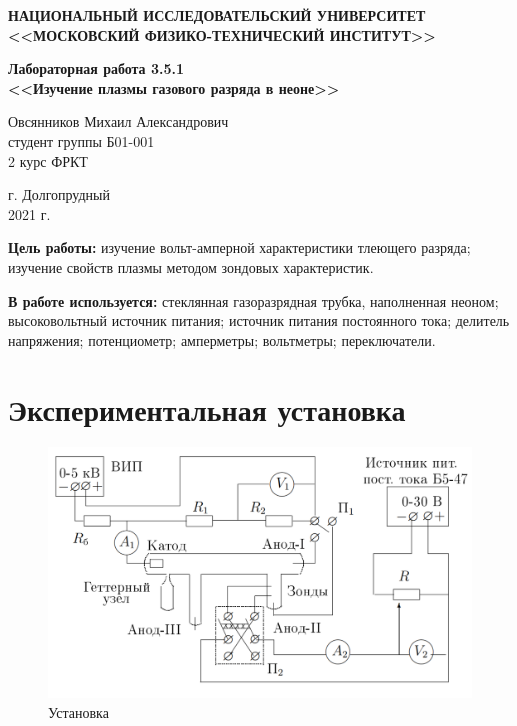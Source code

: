 \documentclass[a4paper,12pt]{article} %
\begin{document}
	
	
	\begin{center}
		
		
		\textbf{НАЦИОНАЛЬНЫЙ ИССЛЕДОВАТЕЛЬСКИЙ УНИВЕРСИТЕТ \\ <<МОСКОВСКИЙ ФИЗИКО-ТЕХНИЧЕСКИЙ ИНСТИТУТ>>}
		\vspace{13ex}
		
		\textbf{Лабораторная работа 3.5.1\\ <<Изучение плазмы газового разряда в неоне>>}
		\vspace{40ex}
		
		\normalsize{Овсянников Михаил Александрович \\ студент группы Б01-001\\ 2 курс ФРКТ\\}
	\end{center}
	
	\vfill 
	
	\begin{center}
		г. Долгопрудный\\ 
		2021 г.
	\end{center}
	
	
	\thispagestyle{empty} %
	\newpage
	
	\textbf{Цель работы:} изучение вольт-амперной характеристики тлеющего разряда; изучение свойств плазмы методом зондовых характеристик.
	\vspace{5mm}
	
	\textbf{В работе используется:} стеклянная газоразрядная трубка, наполненная неоном; высоковольтный источник питания; источник питания постоянного тока; делитель напряжения; потенциометр; амперметры; вольтметры; переключатели.
	
	
	\section*{Экспериментальная установка}
	
	\begin{figure}[h!]
		\centering
		\includegraphics[scale=0.6]{Pictures/Установка.png}
		\caption{Установка}
	\end{figure}
\end{document}
